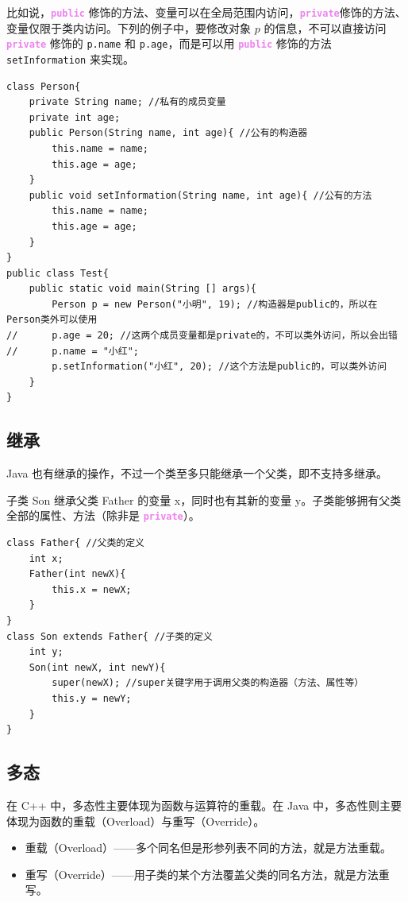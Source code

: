 \documentclass[UTF8]{ctexart}
\newcommand\Emph[1]{\colorbox{green!10}{\textcolor{green!30!black}{#1}}}
\newcommand\keyword[1]{\textcolor{violet}{\textbf{\texttt{#1}}}}
\begin{document}
比如说，\keyword{public} 修饰的方法、变量可以在全局范围内访问，\keyword{private}修饰的方法、变量仅限于类内访问。下列的例子中，要修改对象 $p$ 的信息，不可以直接访问 \keyword{private} 修饰的 \verb!p.name! 和 \verb!p.age!，而是可以用 \keyword{public} 修饰的方法 \verb!setInformation! 来实现。
\begin{lstlisting}
class Person{
    private String name; //私有的成员变量
    private int age;
    public Person(String name, int age){ //公有的构造器
        this.name = name;
        this.age = age;
    }
    public void setInformation(String name, int age){ //公有的方法
        this.name = name;
        this.age = age;
    }
}
public class Test{
    public static void main(String [] args){
        Person p = new Person("小明", 19); //构造器是public的，所以在Person类外可以使用
//      p.age = 20; //这两个成员变量都是private的，不可以类外访问，所以会出错
//      p.name = "小红";
        p.setInformation("小红", 20); //这个方法是public的，可以类外访问
    }
}
\end{lstlisting}

\subsection{继承}

Java 也有继承的操作，不过\Emph{一个类至多只能继承一个父类}，即不支持多继承。

子类 Son 继承父类 Father 的变量 x，同时也有其新的变量 y。子类能够拥有父类全部的属性、方法（除非是 \keyword{private}）。

\begin{lstlisting}
class Father{ //父类的定义
    int x;
    Father(int newX){
        this.x = newX;
    }
}
class Son extends Father{ //子类的定义
    int y;
    Son(int newX, int newY){
        super(newX); //super关键字用于调用父类的构造器（方法、属性等）
        this.y = newY;
    }
}
\end{lstlisting}


\subsection{多态}
在 C++ 中，多态性主要体现为函数与运算符的重载。在 Java 中，多态性则主要体现为函数的重载（Overload）与重写（Override）。

\begin{itemize}[itemsep=0pt,parsep=0pt]
  \item 重载（Overload）——多个同名但是形参列表不同的方法，就是方法重载。
  \item 重写（Override）——用子类的某个方法覆盖父类的同名方法，就是方法重写。
\end{itemize}
\end{document}
